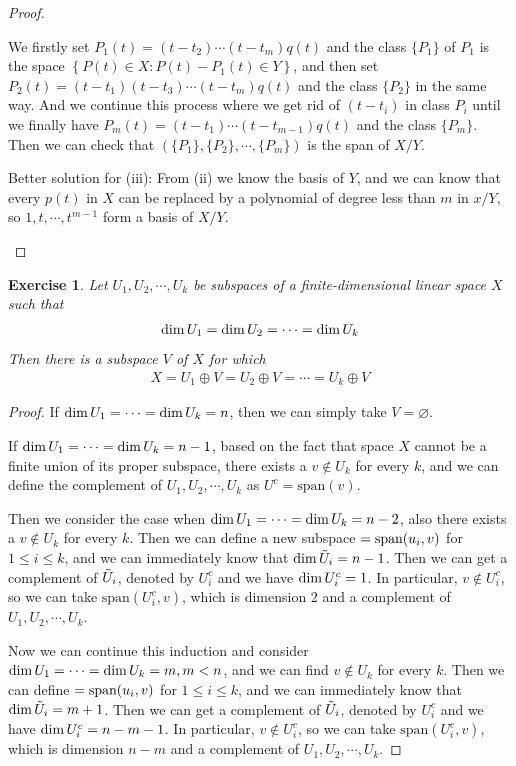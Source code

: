 \documentclass[11pt]{book}
\newtheorem{exercise}{Exercise}[section]
\theoremstyle{definition}
\numberwithin{equation}{chapter}
\begin{document}
\begin{proof}
\begin{enumerate}[label=(\alph*)]
    We firstly set $P_1(t) = (t-t_2)\cdots(t-t_m)q(t)$ and the class $\{P_1\}$ of $P_1$ is the space $\left\{P(t)\in X: P(t) - P_1(t) \in Y \right\}$, and then set $P_2(t) = (t-t_1)(t-t_3)\cdots(t-t_m)q(t)$ and the class $\{P_2 \}$ in the same way. And we continue this process where we get rid of $(t-t_i)$ in class $P_i$ until we finally have $P_m(t) = (t-t_1)\cdots(t-t_{m-1})q(t)$ and the class $\{P_m \}$. Then we can check that $( \{P_1\}, \{P_2\}, \cdots, \{P_m\})$ is the span of $X/Y$.
    
    Better solution for (iii): From (ii) we know the basis of $Y$, and we can know that every $p(t)$ in $X$ can be replaced by a polynomial of degree less than $m$ in $x/Y$, so $1, t, \cdots, t^{m-1}$ form a basis of $X/Y$.
\end{enumerate}
\end{proof}

\medskip

\begin{exercise}\label{ex_5}
Let $U_1,U_2,\cdots,U_k$ be subspaces of a finite-dimensional linear space $X$ such that
\begin{align*}
    {\rm dim}\,U_1 = {\rm dim}\,U_2 = \cdots = {\rm dim}\,U_k
\end{align*}
Then there is a subspace $V$ of $X$ for which
\begin{align*}
    X = U_1\oplus V = U_2\oplus V = \cdots = U_k\oplus V
\end{align*}
\end{exercise}
\begin{proof}
If ${\rm dim}\, U_1 = \cdots = {\rm dim}\, U_k = n$, then we can simply take $V = \varnothing$.

If ${\rm dim}\, U_1 = \cdots = {\rm dim}\, U_k = n-1$, based on the fact that space $X$ cannot be a finite union of its proper subspace, there exists a $v \notin U_k$ for every $k$, and we can define the complement of $U_1, U_2, \cdots, U_k$ as $U^c = \text{span}(v)$.

Then we consider the case when ${\rm dim}\, U_1 = \cdots = {\rm dim}\, U_k = n-2$, also there exists a $v \notin U_k$ for every $k$. Then we can define a new subspace $\title{\Tilde{U}_i} = \text{span}(u_i,v)$ for $1 \leq i \leq k$, and we can immediately know that ${\rm dim}\, \Tilde{U}_i = n - 1$. Then we can get a complement of $\Tilde{U}_i$, denoted by $U_i^c$ and we have ${\rm dim}\, U_i^c = 1$. In particular, $v \notin U_i^c$, so we can take $\text{span} (U_i^c, v)$, which is dimension $2$ and a complement of $U_1, U_2, \cdots, U_k$.

Now we can continue this induction and consider ${\rm dim}\, U_1 = \cdots = {\rm dim}\, U_k = m, m < n$, and we can find $v \notin U_k$ for every $k$. Then we can define $\title{\Tilde{U}_i} = \text{span}(u_i,v)$ for $1 \leq i \leq k$, and we can immediately know that ${\rm dim}\, \Tilde{U}_i = m + 1$. Then we can get a complement of $\Tilde{U}_i$, denoted by $U_i^c$ and we have ${\rm dim}\, U_i^c = n - m - 1$. In particular, $v \notin U_i^c$, so we can take $\text{span} (U_i^c, v)$, which is dimension $n - m$ and a complement of $U_1, U_2, \cdots, U_k$.
\end{proof}
\end{document}

